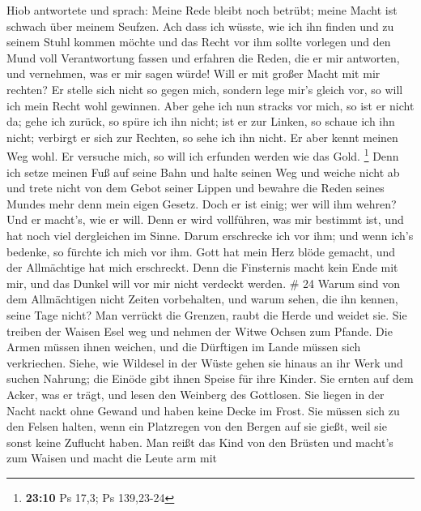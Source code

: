  Hiob antwortete und sprach:  Meine Rede
bleibt noch betrübt; meine Macht ist schwach über meinem Seufzen.
 Ach dass ich wüsste, wie ich ihn finden und zu seinem
Stuhl kommen möchte  und das Recht vor ihm sollte vorlegen
und den Mund voll Verantwortung fassen  und erfahren die
Reden, die er mir antworten, und vernehmen, was er mir sagen würde!
 Will er mit großer Macht mit mir rechten? Er stelle sich
nicht so gegen mich,  sondern lege mir's gleich vor, so
will ich mein Recht wohl gewinnen.  Aber gehe ich nun
stracks vor mich, so ist er nicht da; gehe ich zurück, so spüre ich ihn
nicht;  ist er zur Linken, so schaue ich ihn nicht;
verbirgt er sich zur Rechten, so sehe ich ihn nicht.  Er
aber kennt meinen Weg wohl. Er versuche mich, so will ich erfunden
werden wie das Gold. \footnote{\textbf{23:10} Ps 17,3; Ps 139,23-24}
 Denn ich setze meinen Fuß auf seine Bahn und halte
seinen Weg und weiche nicht ab  und trete nicht von dem
Gebot seiner Lippen und bewahre die Reden seines Mundes mehr denn mein
eigen Gesetz.  Doch er ist einig; wer will ihm wehren?
Und er macht's, wie er will.  Denn er wird vollführen,
was mir bestimmt ist, und hat noch viel dergleichen im Sinne.
 Darum erschrecke ich vor ihm; und wenn ich's bedenke, so
fürchte ich mich vor ihm.  Gott hat mein Herz blöde
gemacht, und der Allmächtige hat mich erschreckt.  Denn
die Finsternis macht kein Ende mit mir, und das Dunkel will vor mir
nicht verdeckt werden. \# 24  Warum sind von dem
Allmächtigen nicht Zeiten vorbehalten, und warum sehen, die ihn kennen,
seine Tage nicht?  Man verrückt die Grenzen, raubt die
Herde und weidet sie.  Sie treiben der Waisen Esel weg und
nehmen der Witwe Ochsen zum Pfande.  Die Armen müssen
ihnen weichen, und die Dürftigen im Lande müssen sich verkriechen.
 Siehe, wie Wildesel in der Wüste gehen sie hinaus an ihr
Werk und suchen Nahrung; die Einöde gibt ihnen Speise für ihre Kinder.
 Sie ernten auf dem Acker, was er trägt, und lesen den
Weinberg des Gottlosen.  Sie liegen in der Nacht nackt
ohne Gewand und haben keine Decke im Frost.  Sie müssen
sich zu den Felsen halten, wenn ein Platzregen von den Bergen auf sie
gießt, weil sie sonst keine Zuflucht haben.  Man reißt das
Kind von den Brüsten und macht's zum Waisen und macht die Leute arm mit
